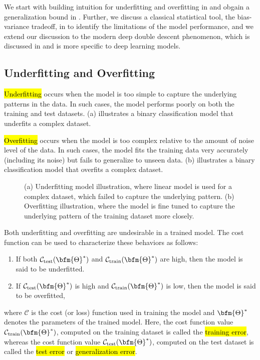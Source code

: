 We start with building intuition for underfitting and overfitting in  and obgain a generalization bound in .  Further, we discuss a classical statistical tool, the bias-variance tradeoff, in  to identify the limitations of the model performance, and we extend our discussion to the modern deep double descent phenomenon, which is discussed in  and is more specific to deep learning models.
\subsection{Underfitting and Overfitting}\label{underfitting.overfitting.sec}
\hl{Underfitting} occurs when the model is too simple to capture the underlying patterns in the data.  In such cases, the model performs poorly on both the training and test datasets.  (a) illustrates a binary classification model that underfits a complex dataset.

\hl{Overfitting} occurs when the model is too complex relative to the amount of noise level of the data. In such cases, the model fits the training data very accurately (including its noise) but fails to generalize to unseen data.  (b) illustrates a binary classification model that overfits a complex dataset.
\begin{figure}[t]
\centering

\vspace{-0.2in}
\caption{(a) Underfitting model illustration, where linear model is used for a complex dataset, which failed to capture the underlying pattern. (b) Overfitting illustration, where the model is fine tuned to capture the underlying pattern of the training dataset more closely.}
\label{underfit-overfit.fig}
\end{figure}

Both underfitting and overfitting are undesirable in a trained model.  The cost function can be used to characterize these behaviors as follows:
\begin{enumerate}
\item If both $\mathcal{C}_{\text{test}}(\bfm{\Theta}^*)$ and $\mathcal{C}_{\text{train}}(\bfm{\Theta}^*)$ are high, then the model is said to be underfitted.
%
\item If $\mathcal{C}_{\text{test}}(\bfm{\Theta}^*)$ is high and $\mathcal{C}_{\text{train}}(\bfm{\Theta}^*)$ is low, then the model is said to be overfitted,
\end{enumerate}
where $\mathcal{C}$ is the cost (or loss) function used in training the model and $\bfm{\Theta}^*$ denotes the parameters of the trained model.  Here, the cost function value $\mathcal{C}_\text{train}(\bfm{\Theta}^*)$, computed on the training dataset is called the \hl{training error}, whereas the cost function value
$\mathcal{C}_\text{test}(\bfm{\Theta}^*)$, computed on the test dataset is called the \hl{test error} or \hl{generalization error}.

